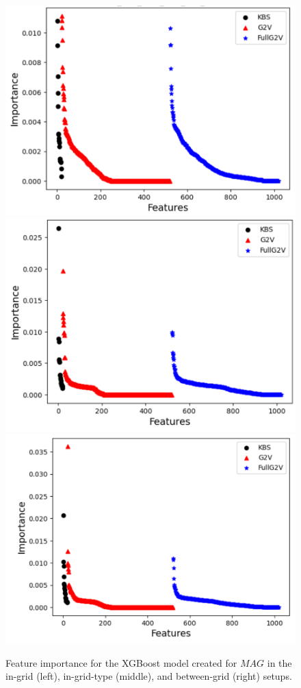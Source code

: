 \documentclass[letterpaper]{article} %
\newcommand{\mapfgas}[1]{\ensuremath{\textit{MAG}}\xspace}
\begin{document}
\begin{figure}[tbhp]
    \centering
    \includegraphics[width=0.6\columnwidth]{Images/in-grid-fi.pdf}
    \includegraphics[width=0.6\columnwidth]{Images/in-grid-type-fi.pdf}
    \includegraphics[width=0.6\columnwidth]{Images/between-grid-fi2.pdf}
    \caption{Feature importance for the XGBoost model created for \mapfgas\, in the in-grid (left), in-grid-type (middle), and between-grid (right) setups.} 
    \label{fig:model_coefs}
\end{figure}
\end{document}
